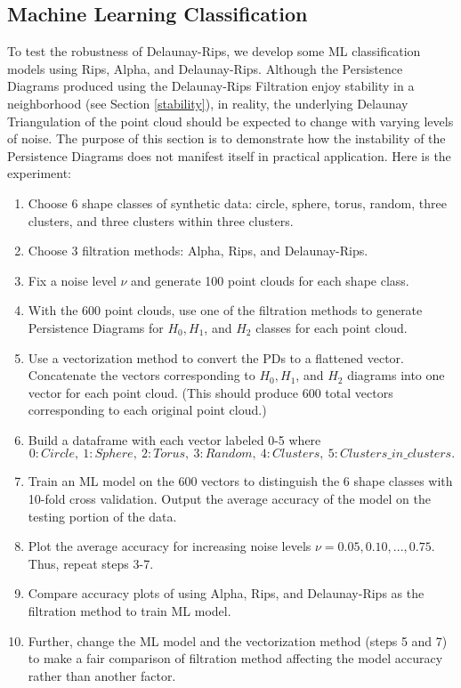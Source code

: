 \documentclass[letterpaper,titlepage]{article}
\begin{document}
\subsection{Machine Learning Classification}
    To test the robustness of Delaunay-Rips, we develop some ML classification models using Rips, Alpha, and Delaunay-Rips. Although the Persistence Diagrams produced using the Delaunay-Rips Filtration enjoy stability in a neighborhood (see Section \ref{stability}), in reality, the underlying Delaunay Triangulation of the point cloud should be expected to change with varying levels of noise. The purpose of this section is to demonstrate how the instability of the Persistence Diagrams does not manifest itself in practical application. Here is the experiment:
    \begin{enumerate}
        \item Choose 6 shape classes of synthetic data: circle, sphere, torus, random, three clusters, and three clusters within three clusters.
        \item Choose 3 filtration methods: Alpha, Rips, and Delaunay-Rips.
        \item Fix a noise level $\nu$ and generate 100 point clouds for each shape class.
        \item With the 600 point clouds, use one of the filtration methods to generate Persistence Diagrams for $H_0, H_1$, and $H_2$ classes for each point cloud.
        \item Use a vectorization method to convert the PDs to a flattened vector. Concatenate the vectors corresponding to $H_0, H_1$, and $H_2$ diagrams into one vector for each point cloud. (This should produce 600 total vectors corresponding to each original point cloud.)
        \item Build a dataframe with each vector labeled 0-5 where
        \[
            0: Circle,\ 1: Sphere,\ 2: Torus,\ 3: Random,\ 4: Clusters,\ 5: Clusters\_in\_clusters.
        \]
        \item Train an ML model on the 600 vectors to distinguish the 6 shape classes with 10-fold cross validation. Output the average accuracy of the model on the testing portion of the data.
        \item Plot the average accuracy for increasing noise levels $\nu=0.05, 0.10,...,0.75$. Thus, repeat steps 3-7.
        \item Compare accuracy plots of using Alpha, Rips, and Delaunay-Rips as the filtration method to train ML model.
        \item Further, change the ML model and the vectorization method (steps 5 and 7) to make a fair comparison of filtration method affecting the model accuracy rather than another factor.
    \end{enumerate}
    
\end{document}
